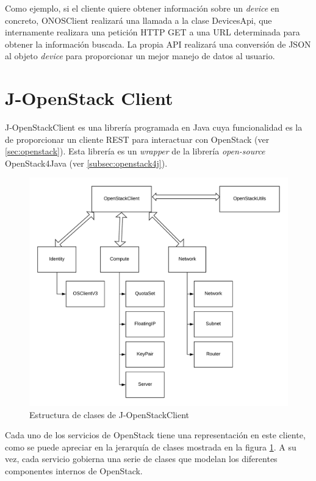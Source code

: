 Como ejemplo, si el cliente quiere obtener información sobre un \textit{device} en concreto, ONOSClient realizará una llamada a la clase DevicesApi, que internamente realizara una petición \ac{HTTP} GET a una \ac{URL} determinada para obtener la información buscada. La propia \ac{API} realizará una conversión de \ac{JSON} al objeto \textit{device} para proporcionar un mejor manejo de datos al usuario.


\section{J-OpenStack Client}
\label{sec:openstackclient}

J-OpenStackClient\cite{openstack4jjavadocbib} es una librería programada en Java cuya funcionalidad es la de proporcionar un cliente \ac{REST} para interactuar con OpenStack (ver \ref{sec:openstack}). Esta librería es un \textit{wrapper} de la librería \textit{open-source} OpenStack4Java (ver \ref{subsec:openstack4j}).


\begin{figure}[!ht]
	\centering
	\includegraphics[width=1\linewidth]{imagenes/OpenStackClient}
	\caption{Estructura de clases de J-OpenStackClient}
	\label{fig:openstackclient}
\end{figure}

Cada uno de los servicios de OpenStack tiene una representación en este cliente, como se puede apreciar en la jerarquía de clases mostrada en la figura \ref{fig:openstackclient}. A su vez, cada servicio gobierna una serie de clases que modelan los diferentes componentes internos de OpenStack. 

